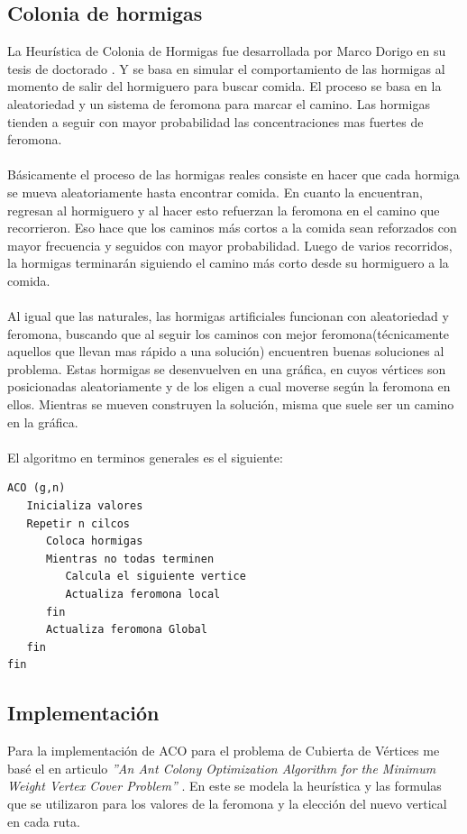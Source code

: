 \documentclass[oneside,12pt]{article}
\begin{document}
\subsection{Colonia de hormigas}
La Heurística de Colonia de Hormigas fue desarrollada por Marco Dorigo en su tesis de doctorado \cite{ACOorigen} . Y se basa en simular el comportamiento de las hormigas al momento de salir del hormiguero para buscar comida. El proceso se basa en la aleatoriedad y un sistema de feromona para marcar el camino. Las hormigas tienden a seguir con mayor probabilidad las concentraciones mas fuertes de feromona.\\\\
Básicamente el proceso de las hormigas reales consiste en hacer que cada hormiga se mueva aleatoriamente hasta encontrar comida. En cuanto la encuentran, regresan al hormiguero y al hacer esto refuerzan la feromona en el camino que recorrieron. Eso hace que los caminos más cortos a la comida sean reforzados con mayor frecuencia y seguidos con mayor probabilidad. Luego de varios recorridos, la hormigas terminarán siguiendo el camino más corto desde su hormiguero a la comida.\\\\
Al igual que las naturales, las hormigas artificiales funcionan con aleatoriedad y feromona, buscando que al seguir los caminos con mejor feromona(técnicamente aquellos que llevan mas rápido a una solución) encuentren buenas soluciones al problema. Estas hormigas se desenvuelven en una gráfica, en cuyos vértices son posicionadas aleatoriamente y de los eligen a cual moverse según la feromona en ellos. Mientras se mueven  construyen la solución, misma que suele ser un camino en la gráfica.\\\\
El algoritmo en terminos generales es el siguiente:\\
\begin{lstlisting}[frame=single]
ACO (g,n)
   Inicializa valores
   Repetir n cilcos
      Coloca hormigas
      Mientras no todas terminen
         Calcula el siguiente vertice
         Actualiza feromona local
      fin
      Actualiza feromona Global
   fin
fin
\end{lstlisting}

\subsection{Implementación}
Para la implementación de ACO para el problema de Cubierta de Vértices me basé el en articulo \emph{''An Ant Colony Optimization Algorithm for the Minimum Weight Vertex Cover Problem''} \cite{ACOVC} . En este se modela la heurística y las formulas que se utilizaron para los valores de la feromona y la elección del nuevo vertical en cada ruta.\\\\
\end{document}
